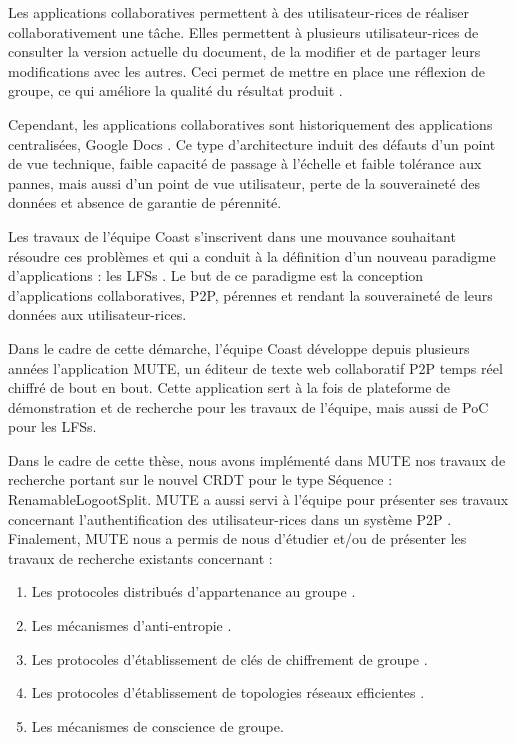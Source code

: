 Les applications collaboratives permettent à des utilisateur-rices de réaliser collaborativement une tâche.
Elles permettent à plusieurs utilisateur-rices de consulter la version actuelle du document, de la modifier et de partager leurs modifications avec les autres.
Ceci permet de mettre en place une réflexion de groupe, ce qui améliore la qualité du résultat produit \cite{2004-empirical-study-collaborative-writing,2005-internet-encyclopaedias-head-to-head}.

Cependant, les applications collaboratives sont historiquement des applications centralisées, \eg Google Docs \cite{gdocs}.
Ce type d'architecture induit des défauts d'un point de vue technique, \eg faible capacité de passage à l'échelle et faible tolérance aux pannes, mais aussi d'un point de vue utilisateur, \eg perte de la souveraineté des données et absence de garantie de pérennité.

Les travaux de l'équipe Coast s'inscrivent dans une mouvance souhaitant résoudre ces problèmes et qui a conduit à la définition d'un nouveau paradigme d'applications : les \acp{LFS} \cite{localfirstsoftware2019}.
Le but de ce paradigme est la conception d'applications collaboratives, \ac{P2P}, pérennes et rendant la souveraineté de leurs données aux utilisateur-rices.

Dans le cadre de cette démarche, l'équipe Coast développe depuis plusieurs années l'application \acf{MUTE}, un éditeur de texte web collaboratif \ac{P2P} temps réel chiffré de bout en bout.
Cette application sert à la fois de plateforme de démonstration et de recherche pour les travaux de l'équipe, mais aussi de \ac{PoC} pour les \acp{LFS}.

Dans le cadre de cette thèse, nous avons implémenté dans \ac{MUTE} nos travaux de recherche portant sur le nouvel \ac{CRDT} pour le type Séquence : RenamableLogootSplit.
\ac{MUTE} a aussi servi à l'équipe pour présenter ses travaux concernant l'authentification des utilisateur-rices dans un système \ac{P2P} \cite{2018-trusternity-long}.
Finalement, \ac{MUTE} nous a permis de nous d'étudier et/ou de présenter les travaux de recherche existants concernant :
\begin{enumerate}
    \item Les protocoles distribués d'appartenance au groupe \cite{swim2002}.
    \item Les mécanismes d'anti-entropie \cite{1983-anti-entropy-vv}.
    \item Les protocoles d'établissement de clés de chiffrement de groupe \cite{1995-burmester-desmedt}.
    \item Les protocoles d'établissement de topologies réseaux efficientes \cite{2018-spray-nedelec}.
    \item Les mécanismes de conscience de groupe.
\end{enumerate}

